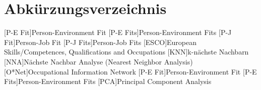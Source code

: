 \renewcommand{\chaptermark}[1]{\markboth{\spacedlowsmallcaps{#1}}{\spacedlowsmallcaps{#1}}}
\renewcommand{\sectionmark}[1]{\markright{\thesection\enspace\spacedlowsmallcaps{#1}}}
\chapter*{Abk\"{u}rzungsverzeichnis}

\begin{acronym}[UML]
  [P-E Fit]{Person-Environment Fit}
  [P-E Fits]{Person-Environment Fits}
  [P-J Fit]{Person-Job Fit}
  [P-J Fits]{Person-Job Fits}
  [ESCO]{European Skills/Competences, Qualifications and Occupations}
  [KNN]{k-nächste Nachbarn}
  [NNA]{Nächste Nachbar Analyse (Nearest Neighbor Analysis)}
  [O*Net]{Occupational Information Network}
  [P-E Fit]{Person-Environment Fit}
  [P-E Fits]{Person-Environment Fits}
  [PCA]{Principal Component Analysis}
\end{acronym}

\cleardoublepage
